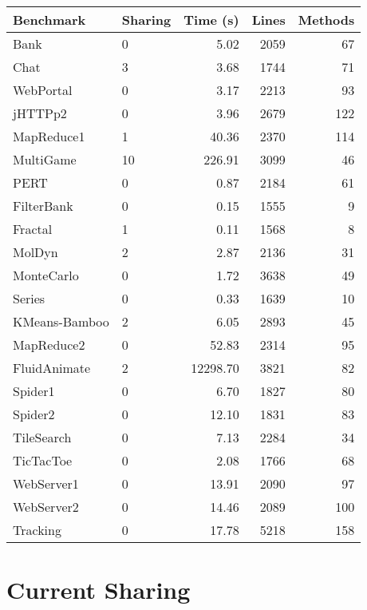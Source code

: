 \documentclass{amsart}[9pt]
\begin{document}
\begin{tabular}{|l|l|r|r|r|}
\hline
Benchmark & Sharing & Time (s) & Lines & Methods \\
\hline
Bank & 0 & 5.02 & 2059 & 67 \\
Chat & 3 & 3.68 & 1744 & 71 \\
WebPortal & 0 & 3.17 & 2213 & 93 \\
jHTTPp2 & 0 & 3.96 & 2679 & 122 \\
MapReduce1 & 1 & 40.36 & 2370 & 114 \\
MultiGame & 10 & 226.91 & 3099 & 46 \\
PERT & 0 & 0.87 & 2184 & 61 \\
FilterBank & 0 & 0.15 & 1555 & 9 \\
Fractal & 1 & 0.11 & 1568 & 8 \\
MolDyn & 2 & 2.87 & 2136 & 31 \\
MonteCarlo & 0 & 1.72 & 3638 & 49 \\
Series & 0 & 0.33 & 1639 & 10 \\
KMeans-Bamboo & 2 & 6.05 & 2893 & 45 \\
MapReduce2 & 0 & 52.83 & 2314 & 95 \\
FluidAnimate & 2 & 12298.70 & 3821 & 82 \\
Spider1 & 0 & 6.70 & 1827 & 80 \\
Spider2 & 0 & 12.10 & 1831 & 83 \\
TileSearch & 0 & 7.13 & 2284 & 34 \\
TicTacToe & 0 & 2.08 & 1766 & 68 \\
WebServer1 & 0 & 13.91 & 2090 & 97 \\
WebServer2 & 0 & 14.46 & 2089 & 100 \\
Tracking & 0 & 17.78 & 5218 & 158 \\
\hline
\end{tabular}








\section{Current Sharing}
\end{document}
